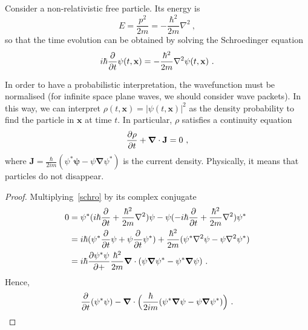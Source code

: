     \begin{example}
        Consider a non-relativistic free particle. Its energy is 
        \begin{equation*}
            E = \frac{p^2}{2m} = - \frac{\hbar^2}{2m} \nabla^2 ~,
        \end{equation*}
        so that the time evolution can be obtained by solving the Schroedinger equation 
        \begin{equation*}
            i \hbar \frac{\partial}{\partial t} \psi(t, \mathbf x) = - \frac{\hbar^2}{2m } \nabla^2 \psi(t, \mathbf x) ~.
        \end{equation*}
    \end{example}

    In order to have a probabilistic interpretation, the wavefunction must be normalised (for infinite space plane waves, we should consider wave packets). In this way, we can interpret $\rho (t, \mathbf x) = |\psi(t, \mathbf x)|^2$ as the density probability to find the particle in $\mathbf x$ at time $t$. In particular, $\rho$ satisfies a continuity equation 
    \begin{equation*}
        \frac{\partial\rho}{\partial t} + \boldsymbol \nabla \cdot \mathbf J = 0 ~,
    \end{equation*}
    where $\mathbf J = \frac{\hbar}{2im} (\psi^* \boldsymbol \psi - \psi \boldsymbol \nabla \psi^*)$ is the current density. Physically, it means that particles do not disappear. 
    \begin{proof}
        Multiplying~\eqref{schro} by its complex conjugate
        \begin{equation*}
        \begin{aligned}
            0 & = \psi^* (i \hbar \frac{\partial}{\partial t} + \frac{\hbar^2}{2m } \nabla^2) \psi - \psi (- i \hbar \frac{\partial}{\partial t} + \frac{\hbar^2}{2m } \nabla^2) \psi^* \\ & = i \hbar (\psi^* \frac{\partial}{\partial t} \psi + \psi \frac{\partial}{\partial t} \psi^*) + \frac{\hbar^2}{2m} (\psi^* \nabla^2 \psi - \psi \nabla^2 \psi^*) \\ & = i \hbar \frac{\partial\psi^* \psi}{\partial+} \frac{\hbar^2}{2m} \boldsymbol \nabla \cdot (\psi \boldsymbol \nabla \psi^*- \psi^* \boldsymbol \nabla \psi) ~.
        \end{aligned}
        \end{equation*}
        Hence, 
        \begin{equation*}
            \frac{\partial}{\partial t} (\psi^* \psi) - \boldsymbol \nabla \cdot \Big (\frac{\hbar}{2im} (\psi^* \boldsymbol \nabla \psi - \psi \boldsymbol \nabla \psi^*) \Big ) ~.
        \end{equation*}
    \end{proof}

